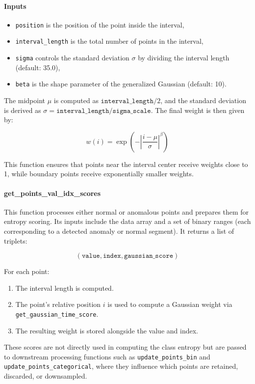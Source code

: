 \documentclass[11pt]{article}
\begin{document}
\paragraph{Inputs}
\begin{itemize}
  \item \texttt{position} is the position of the point inside the interval,
  \item \texttt{interval\_length} is the total number of points in the interval,
  \item \texttt{sigma} controls the standard deviation \( \sigma \) by dividing the interval length (default: 35.0),
  \item \texttt{beta} is the shape parameter of the generalized Gaussian (default: 10).
\end{itemize}

The midpoint \( \mu \) is computed as \( \texttt{interval\_length} / 2 \), and the standard deviation is derived as \( \sigma = \texttt{interval\_length} / \texttt{sigma\_scale} \). The final weight is then given by:

\[
w(i) = \exp\left( - \left| \frac{i - \mu}{\sigma} \right|^{\beta} \right)
\]

This function ensures that points near the interval center receive weights close to 1, while boundary points receive exponentially smaller weights.

\paragraph{get\_points\_val\_idx\_scores}

This function processes either normal or anomalous points and prepares them for entropy scoring. Its inputs include the data array and a set of binary ranges (each corresponding to a detected anomaly or normal segment). It returns a list of triplets:

\[
(\texttt{value}, \texttt{index}, \texttt{gaussian\_score})
\]

For each point:
\begin{enumerate}
  \item The interval length is computed.
  \item The point’s relative position \( i \) is used to compute a Gaussian weight via \texttt{get\_gaussian\_time\_score}.
  \item The resulting weight is stored alongside the value and index.
\end{enumerate}

These scores are not directly used in computing the class entropy but are passed to downstream processing functions such as \texttt{update\_points\_bin} and \texttt{update\_points\_categorical}, where they influence which points are retained, discarded, or downsampled.
\end{document}

